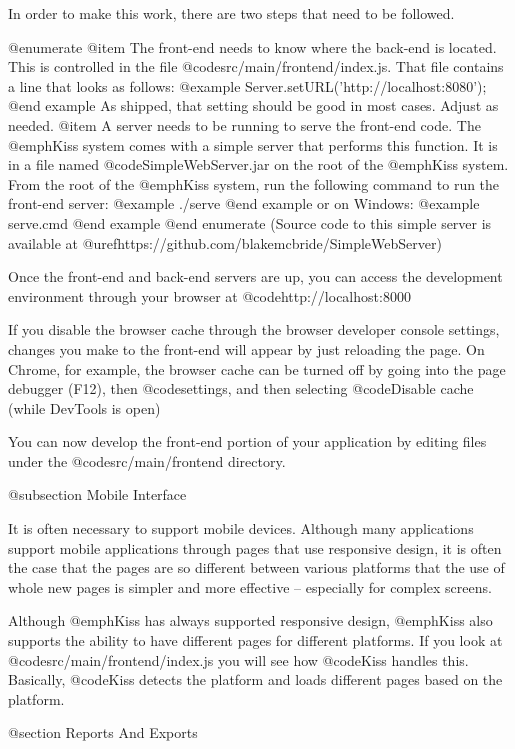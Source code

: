 In order to make this work, there are two steps that
need to be followed.

@enumerate
@item
The front-end needs to know where the back-end is located.  This is
controlled in the file @code{src/main/frontend/index.js}.  That file
contains a line that looks as follows:
@example
    Server.setURL('http://localhost:8080');
@end example
As shipped, that setting should be good in most cases.  Adjust as needed.
@item
A server needs to be running to serve the front-end code.  The
@emph{Kiss} system comes with a simple server that performs this
function.  It is in a file named @code{SimpleWebServer.jar} on the
root of the @emph{Kiss} system.  From the root of the @emph{Kiss}
system, run the following command to run the front-end server:
@example
   ./serve
@end example
or on Windows:
@example
   serve.cmd
@end example
@end enumerate
(Source code to this simple server is available at 
@uref{https://github.com/blakemcbride/SimpleWebServer})

Once the front-end and back-end servers are up, you can access the development
environment through your browser at @code{http://localhost:8000}

If you disable the browser cache through the browser developer console
settings, changes you make to the front-end will appear by just
reloading the page.  On Chrome, for example, the browser cache can be
turned off by going into the page debugger (F12), then
@code{settings}, and then selecting @code{Disable cache (while DevTools
is open)}

You can now develop the front-end portion of your application by
editing files under the @code{src/main/frontend} directory.

@subsection Mobile Interface

It is often necessary to support mobile devices.  Although many
applications support mobile applications through pages that use
responsive design, it is often the case that the pages are so
different between various platforms that the use of whole new pages is
simpler and more effective -- especially for complex screens.

Although @emph{Kiss} has always supported responsive design,
@emph{Kiss} also supports the ability to have different pages for
different platforms.  If you look at @code{src/main/frontend/index.js}
you will see how @code{Kiss} handles this.  Basically, @code{Kiss}
detects the platform and loads different pages based on the platform.


@section Reports And Exports

